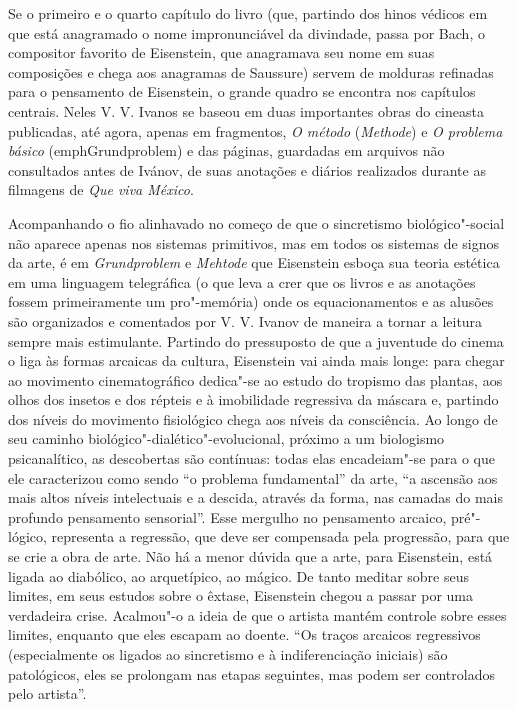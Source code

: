 Se o primeiro e o quarto capítulo do livro (que, partindo dos hinos
védicos em que está anagramado o nome impronunciável da divindade, passa
por Bach, o compositor favorito de Eisenstein, que anagramava seu nome
em suas composições e chega aos anagramas de Saussure) servem de
molduras refinadas para o pensamento de Eisenstein, o grande quadro se
encontra nos capítulos centrais. Neles V. V. Ivanos se baseou em duas
importantes obras do cineasta publicadas, até agora, apenas em
fragmentos, \emph{O método} (\emph{Methode}) e \emph{O problema básico} (emph{Grundproblem}) e das páginas, guardadas em arquivos não consultados
antes de Ivánov, de suas anotações e diários realizados durante as
filmagens de \emph{Que viva México}.

Acompanhando o fio alinhavado no começo de que o sincretismo
biológico"-social não aparece apenas nos sistemas primitivos, mas em
todos os sistemas de signos da arte, é em \emph{Grundproblem} e
\emph{Mehtode} que Eisenstein esboça sua teoria estética em uma
linguagem telegráfica (o que leva a crer que os livros e as anotações
fossem primeiramente um pro"-memória) onde os equacionamentos e as
alusões são organizados e comentados por V. V. Ivanov de maneira a tornar
a leitura sempre mais estimulante. Partindo do pressuposto de que a
juventude do cinema o liga às formas arcaicas da cultura, Eisenstein vai
ainda mais longe: para chegar ao movimento cinematográfico dedica"-se ao
estudo do tropismo das plantas, aos olhos dos insetos e dos répteis e à
imobilidade regressiva da máscara e, partindo dos níveis do movimento
fisiológico chega aos níveis da consciência. Ao longo de seu caminho
biológico"-dialético"-evolucional, próximo a um biologismo psicanalítico,
as descobertas são contínuas: todas elas encadeiam"-se para o que ele
caracterizou como sendo ``o problema fundamental'' da arte, ``a ascensão
aos mais altos níveis intelectuais e a descida, através da forma, nas
camadas do mais profundo pensamento sensorial''. Esse mergulho no
pensamento arcaico, pré"-lógico, representa a regressão, que deve ser
compensada pela progressão, para que se crie a obra de arte. Não há a
menor dúvida que a arte, para Eisenstein, está ligada ao diabólico, ao
arquetípico, ao mágico. De tanto meditar sobre seus limites, em seus
estudos sobre o êxtase, Eisenstein chegou a passar por uma verdadeira
crise. Acalmou"-o a ideia de que o artista mantém controle sobre esses
limites, enquanto que eles escapam ao doente. ``Os traços arcaicos
regressivos (especialmente os ligados ao sincretismo e à
indiferenciação iniciais) são patológicos, eles se prolongam nas etapas
seguintes, mas podem ser controlados pelo artista''.

